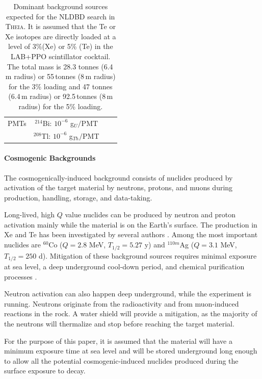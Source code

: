 \begin{table}[t]
\begin{tabular}{lccc}
PMTs                                        & $^{214}$Bi: $10^{-6}$ g$_{U}/$PMT            &                                               \\
                                            & $^{208}$Tl: $10^{-6}$ g$_{Th}/$PMT           &                                               \\
\bottomrule
\end{tabular}
\caption{Dominant background sources expected for the NLDBD search in
\textsc{Theia}. It is assumed that the Te or Xe isotopes are directly
loaded at a level of 3\%(Xe) or 5\% (Te) in the LAB+PPO scintillator cocktail. The
total mass is 28.3 tonnes (6.4\,m radius) or 55\,tonnes (8\,m radius) for the 3\% loading and 47 tonnes (6.4\,m radius) or 92.5\,tonnes (8\,m radius) for the 5\% loading.}
\label{tab::bckg}
\end{table}

\paragraph{Cosmogenic Backgrounds}
The cosmogenically-induced background consists of nuclides produced by
activation of the target material by neutrons, protons, and muons during
production, handling, storage, and data-taking.

Long-lived, high $Q$ value nuclides can be produced by neutron and proton
activation mainly while the material is on the Earth's surface. The production
in Xe and Te has been investigated by several authors
\cite{mei09, baudis15, zhang16, norm05, bard97, wang15, lozza15}. Among
the most important nuclides are $^{60}$Co ($Q=2.8$ MeV, $T_{1/2}=5.27$ y) and
$^{110m}$Ag ($Q=3.1$ MeV, $T_{1/2}=250$ d). Mitigation of these background
sources requires minimal exposure at sea level, a deep underground cool-down
period, and chemical purification processes \cite{snop16}.

Neutron activation can also happen deep underground, while the experiment is
running. Neutrons originate from the radioactivity and from muon-induced
reactions in the rock. A water shield will provide a mitigation, as the
majority of the neutrons will thermalize and stop before reaching the target
material.

For the purpose of this paper, it is assumed that the material will have a
minimum exposure time at sea level and will be stored underground long
enough to allow all the potential cosmogenic-induced nuclides produced during
the surface exposure to decay.\\

